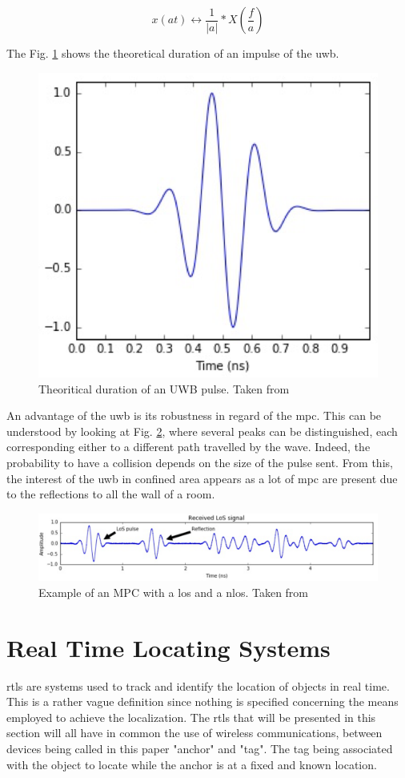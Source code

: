 \begin{equation}
	x(at) \longleftrightarrow \frac{1}{|a|}*X(\frac{f}{a})
\label{fig:eq}
\end{equation}

The Fig. \ref{fig:UWB_time} shows the theoretical duration of an impulse of the \gls{uwb}.


\begin{figure}[H]
\centering
\includegraphics[width=.4\linewidth]{Images/uwb_pulse.png}
\caption{Theoritical duration of an UWB pulse. Taken from \cite{defraye2017determining}}
\label{fig:UWB_time}
\end{figure}

An advantage of the \gls{uwb} is its robustness in regard of the \gls{mpc}. This can be understood by looking at Fig. \ref{fig:UWB_MPC_Theo}, where several peaks can be distinguished, each corresponding either to a different path travelled by the wave. Indeed, the probability to have a collision depends on the size of the pulse sent. From this, the interest of the \gls{uwb} in confined area appears as a lot of \gls{mpc} are present due to the reflections to all the wall of a room.

\begin{figure}[H]
\centering
\includegraphics[width=.9\linewidth]{Images/mpc_pulses.png}
\caption{Example of an MPC with a \gls{los} and a \gls{nlos}. Taken from \cite{defraye2017determining}}
\label{fig:UWB_MPC_Theo}
\end{figure}

\section{Real Time Locating Systems}
\label{rtls}
\gls{rtls} are systems used to track and identify the location of objects in real time. This is a rather vague definition since nothing is specified concerning the means employed to achieve the localization. The \gls{rtls} that will be presented in this section will all have in common the use of wireless communications, between devices being called in this paper "anchor" and "tag". The tag being associated with the object to locate while the anchor is at a fixed and known location.
\vspace{2mm}

